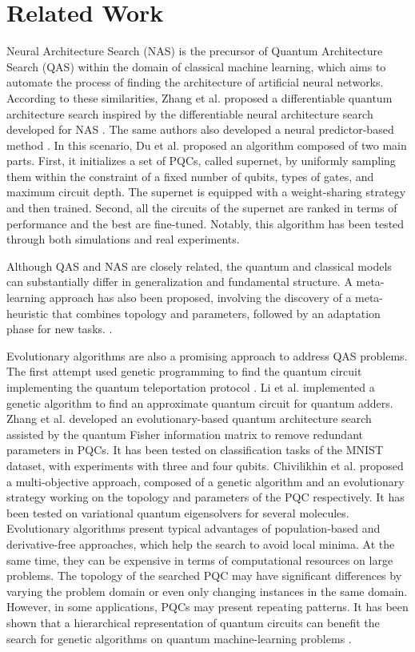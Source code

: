 \section{Related Work}
\label{related_works}
Neural Architecture Search (NAS) is the precursor of Quantum Architecture Search (QAS) within the domain of classical machine learning, which aims to automate the process of finding the architecture of artificial neural networks. According to these similarities, Zhang et al. \cite{zhang2022differentiable} proposed a differentiable quantum architecture search inspired by the differentiable neural architecture search developed for NAS \cite{liu2018darts}. The same authors also developed a neural predictor-based method \cite{zhang2021neural}. In this scenario, Du et al. \cite{du2022quantum} proposed an algorithm composed of two main parts. First, it initializes a set of PQCs, called supernet, by uniformly sampling them within the constraint of a fixed number of qubits, types of gates, and maximum circuit depth. The supernet is equipped with a weight-sharing strategy and then trained. Second, all the circuits of the supernet are ranked in terms of performance and the best are fine-tuned. Notably, this algorithm has been tested through both simulations and real experiments. 

\noindent Although QAS and NAS are closely related, the quantum and classical models can substantially differ in generalization and fundamental structure. A meta-learning approach has also been proposed, involving the discovery of a meta-heuristic that combines topology and parameters, followed by an adaptation phase for new tasks. \cite{he2022quantum}.

Evolutionary algorithms are also a promising approach to address QAS problems. The first attempt used genetic programming to find the quantum circuit implementing the quantum teleportation protocol \cite{williams1998automated}.  Li et al. \cite{li2017approximate} implemented a genetic algorithm to find an approximate quantum circuit for quantum adders. Zhang et al. developed \cite{zhang2023evolutionary} an evolutionary-based quantum architecture search assisted by the quantum Fisher information matrix to remove redundant parameters in PQCs. It has been tested on classification tasks of the MNIST dataset, with experiments with three and four qubits. Chivilikhin et al. \cite{chivilikhin2020mog} proposed a multi-objective approach, composed of a genetic algorithm and an evolutionary strategy working on the topology and parameters of the PQC respectively. It has been tested on variational quantum eigensolvers for several molecules. Evolutionary algorithms present typical advantages of population-based and derivative-free approaches, which help the search to avoid local minima. At the same time, they can be expensive in terms of computational resources on large problems. 
The topology of the searched PQC may have significant differences by varying the problem domain or even only changing instances in the same domain. However, in some applications, PQCs may present repeating patterns. It has been shown that a hierarchical representation of quantum circuits can benefit the search for genetic algorithms on quantum machine-learning problems \cite{lourens2023hierarchical}.

